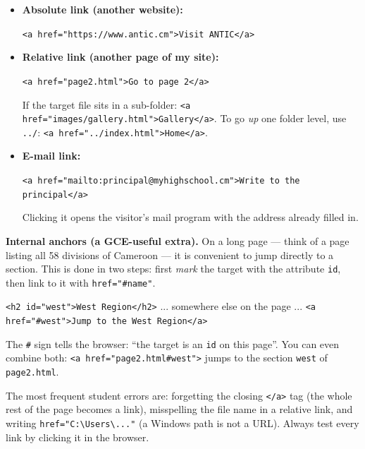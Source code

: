\documentclass[11pt]{article}
\begin{document}
\begin{exemplebox}
\begin{itemize}
\item \textbf{Absolute link (another website):}\par
\texttt{<a href="https://www.antic.cm">Visit ANTIC</a>}
\item \textbf{Relative link (another page of my site):}\par
\texttt{<a href="page2.html">Go to page 2</a>}\par
If the target file sits in a sub-folder: \texttt{<a href="images/gallery.html">Gallery</a>}. To go \emph{up} one folder level, use \texttt{../}: \texttt{<a href="../index.html">Home</a>}.
\item \textbf{E-mail link:}\par
\texttt{<a href="mailto:principal@myhighschool.cm">Write to the principal</a>}\par
Clicking it opens the visitor's mail program with the address already filled in.
\end{itemize}
\end{exemplebox}

\textbf{Internal anchors (a GCE-useful extra).} On a long page --- think of a page listing all 58 divisions of Cameroon --- it is convenient to jump directly to a section. This is done in two steps: first \emph{mark} the target with the attribute \texttt{id}, then link to it with \texttt{href="\#name"}.

\begin{exemplebox}
\texttt{<h2 id="west">West Region</h2>} \quad ... somewhere else on the page ... \quad \texttt{<a href="\#west">Jump to the West Region</a>}\par
The \texttt{\#} sign tells the browser: ``the target is an \texttt{id} on this page''. You can even combine both: \texttt{<a href="page2.html\#west">} jumps to the section \texttt{west} of \texttt{page2.html}.
\end{exemplebox}

\begin{attention}
The most frequent student errors are: forgetting the closing \texttt{</a>} tag (the whole rest of the page becomes a link), misspelling the file name in a relative link, and writing \texttt{href="C:\textbackslash Users\textbackslash ..."} (a Windows path is not a URL). Always test every link by clicking it in the browser.
\end{attention}
\end{document}
